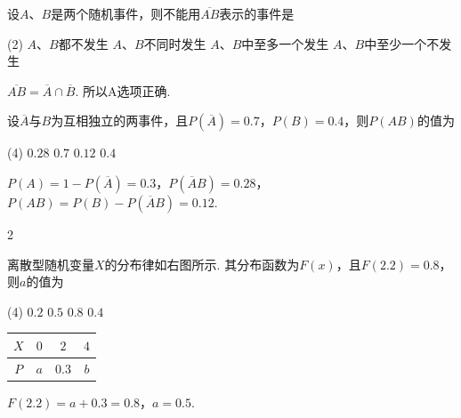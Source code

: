 \begin{problem}
    设$A$、$B$是两个随机事件，则不能用$\overline{AB}$表示的事件是
    \begin{tasks}(2)
        \task[\true] $A$、$B$都不发生
        \task $A$、$B$不同时发生
        \task $A$、$B$中至多一个发生
        \task $A$、$B$中至少一个不发生
    \end{tasks}
\end{problem}
\begin{solution}
    $\overline{AB}=\overline A\cap\overline B$. 所以A选项正确.
\end{solution}

\begin{problem}
    设$\overline A$与$B$为互相独立的两事件，且$P(\overline A)=0.7$，$P(B)=0.4$，则$P(AB)$的值为
    \begin{tasks}(4)
        \task $0.28$
        \task $0.7$
        \task[\true] $0.12$
        \task $0.4$
    \end{tasks}
\end{problem}
\begin{solution}
    $P(A)=1-P(\overline A)=0.3$，$P(\overline AB)=0.28$，$P(AB)=P(B)-P(\overline AB)=0.12$.
\end{solution}

\begin{paracol}{2}
\begin{problem}
    离散型随机变量$X$的分布律如右图所示. 其分布函数为$F(x)$，且$F(2.2)=0.8$，则$a$的值为
    \begin{tasks}(4)
        \task $0.2$
        \task[\true] $0.5$
        \task $0.8$
        \task $0.4$
    \end{tasks}
\switchcolumn\vspace*{\fill}\centering
    \begin{tabular}{cccc}
        \toprule
        $X$ & $0$ & $2$ & $4$\\
        \midrule
        $P$ & $a$ & $0.3$ & $b$\\
        \bottomrule
    \end{tabular}\vspace*{\fill}
\end{problem}
\end{paracol}
\begin{solution}
    $F(2.2)=a+0.3=0.8$，$a=0.5$.
\end{solution}

